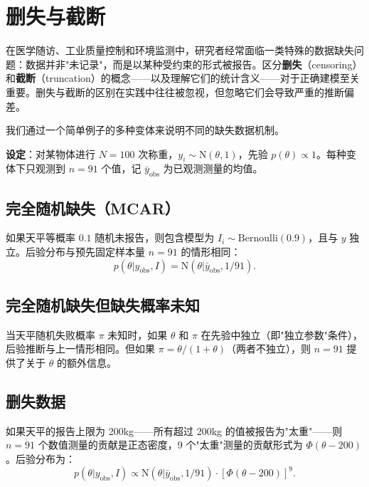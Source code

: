 \section{删失与截断}

在医学随访、工业质量控制和环境监测中，研究者经常面临一类特殊的数据缺失问题：数据并非"未记录"，而是以某种受约束的形式被报告。区分\textbf{删失}（censoring）和\textbf{截断}（truncation）的概念——以及理解它们的统计含义——对于正确建模至关重要。删失与截断的区别在实践中往往被忽视，但忽略它们会导致严重的推断偏差。

我们通过一个简单例子的多种变体来说明不同的缺失数据机制。

\textbf{设定}：对某物体进行 $N=100$ 次称重，$y_i \sim \mathrm{N}(\theta, 1)$，先验 $p(\theta) \propto 1$。每种变体下只观测到 $n=91$ 个值，记 $\bar{y}_{\mathrm{obs}}$ 为已观测测量的均值。

\subsection{完全随机缺失（MCAR）}

如果天平等概率 $0.1$ 随机未报告，则包含模型为 $I_i \sim \mathrm{Bernoulli}(0.9)$，且与 $y$ 独立。后验分布与预先固定样本量 $n=91$ 的情形相同：
\begin{equation}
p(\theta|y_{\mathrm{obs}}, I) = \mathrm{N}(\theta|\bar{y}_{\mathrm{obs}}, 1/91).
\end{equation}

\subsection{完全随机缺失但缺失概率未知}

当天平随机失败概率 $\pi$ 未知时，如果 $\theta$ 和 $\pi$ 在先验中独立（即"独立参数"条件），后验推断与上一情形相同。但如果 $\pi = \theta/(1+\theta)$（两者不独立），则 $n=91$ 提供了关于 $\theta$ 的额外信息。

\subsection{删失数据}

如果天平的报告上限为 200kg——所有超过 200kg 的值被报告为"太重"——则 $n=91$ 个数值测量的贡献是正态密度，9 个"太重"测量的贡献形式为 $\Phi(\theta - 200)$。后验分布为：
\begin{equation}
p(\theta|y_{\mathrm{obs}}, I) \propto \mathrm{N}(\theta|\bar{y}_{\mathrm{obs}}, 1/91) \cdot [\Phi(\theta-200)]^9. \label{eq:ch8-censored-posterior}
\end{equation}

